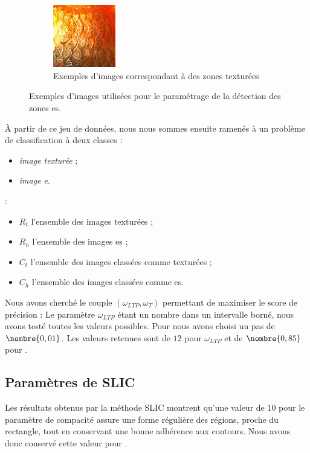\begin{figure}[htb]
\begin{subfigure}[t]{0.45\textwidth}
        \includegraphics[width=0.3\textwidth]{images/asari/LTP/patch_nl3}
        \caption{Exemples d'images correspondant à des zones texturées }
    \end{subfigure}
    \caption{Exemples d'images utilisées pour le paramétrage de la détection des zones es.}
    \label{fig:bddetecsmooth}
\end{figure}


À partir de ce jeu de données,  nous nous sommes ensuite ramenés à un problème de classification à deux classes :
\begin{itemize}
\item \emph{image texturée} ;
\item \emph{image e}.
\end{itemize}
 :
\begin{itemize}
\item $R_{t}$ l'ensemble des images texturées ;
\item $R_{h}$ l'ensemble des images es ;
\item $C_{t}$ l'ensemble des images classées comme texturées ;
\item $C_{h}$ l'ensemble des images classées comme es.
\end{itemize}
Nous avons cherché le couple $(\omega_{LTP},\omega_{T})$ permettant de maximiser le score de précision  :
Le paramètre $\omega_{LTP}$  étant un nombre  dans un intervalle borné, nous avons testé toutes les valeurs possibles. Pour \modif{,} nous avons choisi un pas de $\nombre{0,01}$. 
Les valeurs retenues sont de $12$ pour $\omega_{LTP}$  et de $\nombre{0,85}$ pour .

\subsection{Paramètres de SLIC }
Les résultats obtenus par la méthode SLIC \cite{achanta2012slic,stutz2015superpixel} montrent qu'une valeur de $10$ pour le paramètre de compacité assure une forme régulière des régions, proche du rectangle, tout en conservant une bonne adhérence aux contours. Nous avons donc conservé cette valeur pour . 

